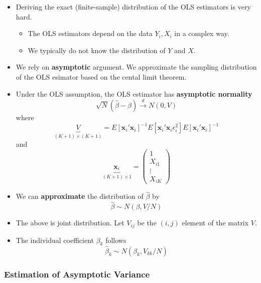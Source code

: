 \documentclass[]{book}
\providecommand{\tightlist}{%
  \setlength{\itemsep}{0pt}\setlength{\parskip}{0pt}}
\begin{document}
\begin{itemize}
\tightlist
\item
  Deriving the exact (finite-sample) distribution of the OLS estimators is very hard.

  \begin{itemize}
  \tightlist
  \item
    The OLS estimators depend on the data \(Y_i, X_i\) in a complex way.
  \item
    We typically do not know the distribution of \(Y\) and \(X\).
  \end{itemize}
\item
  We rely on \textbf{asymptotic} argument. We approximate the sampling distribution of the OLS esimator based on the cental limit theorem.
\item
  Under the OLS assumption, the OLS estimator has \textbf{asymptotic normality}
  \[
  \sqrt{N}(\hat{\beta}-\beta)\overset{d}{\rightarrow}N\left(0,V \right)    
    \]
  where
  \[
    \underbrace{V}_{(K+1)\times(K+1)}
     = E[\mathbf{x}_{i}'\mathbf{x}_{i}]^{-1}E[\mathbf{x}_{i}'\mathbf{x}_{i}\epsilon_{i}^{2}]E[\mathbf{x}_{i}'\mathbf{x}_{i}]^{-1}
    \]
  and
  \[
    \underbrace{\mathbf{x}_{i}}_{(K+1)\times1}=\left(\begin{array}{c}
  1\\
  X_{i1}\\
  \vdots\\
  X_{iK}
  \end{array}\right)
    \]
\item
  We can \textbf{approximate} the distribution of \(\hat{\beta}\) by
  \[
    \hat{\beta} \sim N(\beta, V / N)
    \]
\item
  The above is joint distribution. Let \(V_{ij}\) be the \((i,j)\) element of the matrix \(V\).
\item
  The individual coefficient \(\beta_k\) follows
  \[
   \hat\beta_k \sim N(\beta_k, V_{kk} / N )
  \]
\end{itemize}

\hypertarget{estimation-of-asymptotic-variance}{%
\subsubsection{Estimation of Asymptotic Variance}\label{estimation-of-asymptotic-variance}}
\end{document}
